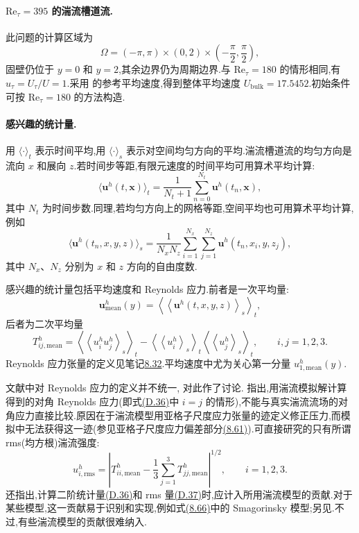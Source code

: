 \begin{example}[湍流槽道流]
\paragraph{$\mathrm{Re}_\tau=395$ 的湍流槽道流.}
此问题的计算区域为
\[
\Omega=(-\pi,\pi)\times(0,2)\times
\left(-\frac{\pi}{2},\frac{\pi}{2}\right),
\]
固壁仍位于 $y=0$ 和 $y=2$,其余边界仍为周期边界.与 $\mathrm{Re}_\tau=180$ 的情形相同,有 $u_\tau=U_\tau/U=1$.采用\textcite{Moser1999} 的参考平均速度,得到整体平均速度 $U_{\mathrm{bulk}}=17.5452$.初始条件可按 $\mathrm{Re}_\tau=180$ 的方法构造.

\paragraph{感兴趣的统计量.}
用 $\langle\cdot\rangle_t$ 表示时间平均,用 $\langle\cdot\rangle_s$ 表示对空间均匀方向的平均.湍流槽道流的均匀方向是流向 $x$ 和展向 $z$.若时间步等距,有限元速度的时间平均可用算术平均计算:
\[
\langle\bm u^h(t,\bm x)\rangle_t
=\frac1{N_t+1}\sum_{n=0}^{N_t}\bm u^h(t_n,\bm x),
\]
其中 $N_t$ 为时间步数.同理,若均匀方向上的网格等距,空间平均也可用算术平均计算,例如
\[
\langle\bm u^h(t_n,x,y,z)\rangle_s
=\frac1{N_xN_z}\sum_{i=1}^{N_x}\sum_{j=1}^{N_z}
\bm u^h(t_n,x_i,y,z_j),
\]
其中 $N_x$、$N_z$ 分别为 $x$ 和 $z$ 方向的自由度数.

感兴趣的统计量包括平均速度和 Reynolds 应力.前者是一次平均量:
\[
\bm u^h_{\mathrm{mean}}(y)
=\left\langle\left\langle
\bm u^h(t,x,y,z)\right\rangle_s\right\rangle_t,
\]
后者为二次平均量
\begin{equation}\label{eq:appendix-d-36}
T^h_{ij,\mathrm{mean}}
=\left\langle\left\langle u_i^h u_j^h\right\rangle_s\right\rangle_t
-\left\langle\left\langle u_i^h\right\rangle_s\right\rangle_t
 \left\langle\left\langle u_j^h\right\rangle_s\right\rangle_t,
\qquad i,j=1,2,3.
\end{equation}
Reynolds 应力张量的定义见笔记\hyperref[note:les-closure-problem]{8.32}.平均速度中尤为关心第一分量 $u^h_{1,\mathrm{mean}}(y)$.

文献中对 Reynolds 应力的定义并不统一,\textcite{JohnRoland2007} 对此作了讨论.\textcite{Winckelmans2002} 指出,用湍流模拟解计算得到的对角 Reynolds 应力(即式\hyperref[eq:appendix-d-36]{(D.36)}中 $i=j$ 的情形),不能与真实湍流流场的对角应力直接比较.原因在于湍流模型用亚格子尺度应力张量的迹定义修正压力,而模拟中无法获得这一迹(参见亚格子尺度应力偏差部分\hyperref[eq:sgs-deviatoric-part]{(8.61)}).可直接研究的只有所谓 rms(均方根)湍流强度:
\begin{equation}\label{eq:appendix-d-37}
u^h_{i,\mathrm{rms}}
=\left|T^h_{ii,\mathrm{mean}}
-\frac13\sum_{j=1}^{3}T^h_{jj,\mathrm{mean}}\right|^{1/2},
\qquad i=1,2,3.
\end{equation}
\textcite{Winckelmans2002} 还指出,计算二阶统计量\hyperref[eq:appendix-d-36]{(D.36)}和 rms 量\hyperref[eq:appendix-d-37]{(D.37)}时,应计入所用湍流模型的贡献.对于某些模型,这一贡献易于识别和实现,例如式\hyperref[eq:smagorinsky-turbulent-viscosity]{(8.66)}中的 Smagorinsky 模型;另见\textcite{JohnRoland2007}.不过,有些湍流模型的贡献很难纳入.


\end{example}
